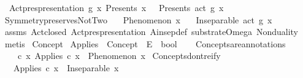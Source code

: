 \begin{isabellebody}
\ \ Act{\isacharunderscore}{\kern0pt}pres{\isacharunderscore}{\kern0pt}presentation{\isacharcolon}{\kern0pt}\ {\isachardoublequoteopen}{\isasymforall}g\ x{\isachardot}{\kern0pt}\ Presents\ x\ {\isasymOmega}\ {\isasymlongrightarrow}\ Presents\ {\isacharparenleft}{\kern0pt}act\ g\ x{\isacharparenright}{\kern0pt}\ {\isasymOmega}{\isachardoublequoteclose}\isanewline
\isanewline
{}\isamarkupfalse%
\ Symmetry{\isacharunderscore}{\kern0pt}preserves{\isacharunderscore}{\kern0pt}NotTwo{\isacharcolon}{\kern0pt}\isanewline
\ \ \ {\isachardoublequoteopen}Phenomenon\ x{\isachardoublequoteclose}\isanewline
\ \ \ {\isachardoublequoteopen}Inseparable\ {\isacharparenleft}{\kern0pt}act\ g\ x{\isacharparenright}{\kern0pt}\ {\isasymOmega}{\isachardoublequoteclose}\isanewline
%
\isadelimproof
\ \ %
\endisadelimproof
%
\isatagproof
{}\isamarkupfalse%
\ assms\ Act{\isacharunderscore}{\kern0pt}closed\ Act{\isacharunderscore}{\kern0pt}pres{\isacharunderscore}{\kern0pt}presentation\ A{}{\isacharunderscore}{\kern0pt}insep{\isacharunderscore}{\kern0pt}def\ substrate{\isacharunderscore}{\kern0pt}Omega\ Nonduality\isanewline
\ \ \isamarkupfalse%
\ {\isacharparenleft}{\kern0pt}metis{\isacharparenright}{\kern0pt}%
\endisatagproof
{\isafoldproof}%
%
\isadelimproof
%
\endisadelimproof
%
\isadelimdocument
%
\endisadelimdocument
%
\isatagdocument
%
\isamarkuptrue%
%
\endisatagdocument
{\isafolddocument}%
%
\isadelimdocument
%
\endisadelimdocument
{}\isamarkupfalse%
\ Concept\isanewline
{}\isamarkupfalse%
\ Applies\ {\isacharcolon}{\kern0pt}{\isacharcolon}{\kern0pt}\ {\isachardoublequoteopen}Concept\ {\isasymRightarrow}\ E\ {\isasymRightarrow}\ bool{\isachardoublequoteclose}\isanewline
\isanewline
{}\isamarkupfalse%
\ \isanewline
\ \ Concepts{\isacharunderscore}{\kern0pt}are{\isacharunderscore}{\kern0pt}annotations{\isacharcolon}{\kern0pt}\isanewline
\ \ \ \ {\isachardoublequoteopen}{\isasymforall}c\ x{\isachardot}{\kern0pt}\ Applies\ c\ x\ {\isasymlongrightarrow}\ Phenomenon\ x{\isachardoublequoteclose}\isanewline
\isanewline
{}\isamarkupfalse%
\ Concepts{\isacharunderscore}{\kern0pt}don{\isacharprime}{\kern0pt}t{\isacharunderscore}{\kern0pt}reify{\isacharcolon}{\kern0pt}\isanewline
\ \ \ {\isachardoublequoteopen}Applies\ c\ x{\isachardoublequoteclose}\ \ {\isachardoublequoteopen}Inseparable\ x\ {\isasymOmega}{\isachardoublequoteclose}\isanewline

\end{isabellebody}
